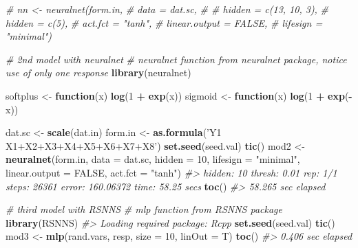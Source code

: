 \documentclass[]{book}
\newenvironment{Shaded}{\begin{snugshade}}{\end{snugshade}}
\newcommand{\CommentTok}[1]{\textcolor[rgb]{0.56,0.35,0.01}{\textit{#1}}}
\newcommand{\ControlFlowTok}[1]{\textcolor[rgb]{0.13,0.29,0.53}{\textbf{#1}}}
\newcommand{\DataTypeTok}[1]{\textcolor[rgb]{0.13,0.29,0.53}{#1}}
\newcommand{\DecValTok}[1]{\textcolor[rgb]{0.00,0.00,0.81}{#1}}
\newcommand{\KeywordTok}[1]{\textcolor[rgb]{0.13,0.29,0.53}{\textbf{#1}}}
\newcommand{\NormalTok}[1]{#1}
\newcommand{\OperatorTok}[1]{\textcolor[rgb]{0.81,0.36,0.00}{\textbf{#1}}}
\newcommand{\OtherTok}[1]{\textcolor[rgb]{0.56,0.35,0.01}{#1}}
\newcommand{\StringTok}[1]{\textcolor[rgb]{0.31,0.60,0.02}{#1}}
\begin{document}
\begin{Shaded}
\begin{Highlighting}[]
\CommentTok{# nn <- neuralnet(form.in,}
\CommentTok{#                 data = dat.sc,}
\CommentTok{#                 # hidden = c(13, 10, 3),}
\CommentTok{#                 hidden = c(5),}
\CommentTok{#                 act.fct = "tanh",}
\CommentTok{#                 linear.output = FALSE,}
\CommentTok{#                 lifesign = "minimal")}
\end{Highlighting}
\end{Shaded}

\begin{Shaded}
\begin{Highlighting}[]
\CommentTok{# 2nd model with neuralnet}
\CommentTok{# neuralnet function from neuralnet package, notice use of only one response}
\KeywordTok{library}\NormalTok{(neuralnet)}

\NormalTok{softplus <-}\StringTok{ }\ControlFlowTok{function}\NormalTok{(x) }\KeywordTok{log}\NormalTok{(}\DecValTok{1} \OperatorTok{+}\StringTok{ }\KeywordTok{exp}\NormalTok{(x))}
\NormalTok{sigmoid  <-}\StringTok{ }\ControlFlowTok{function}\NormalTok{(x) }\KeywordTok{log}\NormalTok{(}\DecValTok{1} \OperatorTok{+}\StringTok{ }\KeywordTok{exp}\NormalTok{(}\OperatorTok{-}\NormalTok{x))}

\NormalTok{dat.sc <-}\StringTok{ }\KeywordTok{scale}\NormalTok{(dat.in)}
\NormalTok{form.in <-}\StringTok{ }\KeywordTok{as.formula}\NormalTok{(}\StringTok{'Y1 ~ X1+X2+X3+X4+X5+X6+X7+X8'}\NormalTok{)}
\KeywordTok{set.seed}\NormalTok{(seed.val)}
\KeywordTok{tic}\NormalTok{()}
\NormalTok{mod2 <-}\StringTok{ }\KeywordTok{neuralnet}\NormalTok{(form.in, }\DataTypeTok{data =}\NormalTok{ dat.sc, }\DataTypeTok{hidden =} \DecValTok{10}\NormalTok{, }\DataTypeTok{lifesign =} \StringTok{"minimal"}\NormalTok{,}
                  \DataTypeTok{linear.output =} \OtherTok{FALSE}\NormalTok{,}
                  \DataTypeTok{act.fct =} \StringTok{"tanh"}\NormalTok{)}
\CommentTok{#> hidden: 10    thresh: 0.01    rep: 1/1    steps:   26361 error: 160.06372    time: 58.25 secs}
\KeywordTok{toc}\NormalTok{()}
\CommentTok{#> 58.265 sec elapsed}
\end{Highlighting}
\end{Shaded}

\begin{Shaded}
\begin{Highlighting}[]
\CommentTok{# third model with RSNNS}
\CommentTok{# mlp function from RSNNS package}
\KeywordTok{library}\NormalTok{(RSNNS)}
\CommentTok{#> Loading required package: Rcpp}
\KeywordTok{set.seed}\NormalTok{(seed.val)}
\KeywordTok{tic}\NormalTok{()}
\NormalTok{mod3 <-}\StringTok{ }\KeywordTok{mlp}\NormalTok{(rand.vars, resp, }\DataTypeTok{size =} \DecValTok{10}\NormalTok{, }\DataTypeTok{linOut =}\NormalTok{ T)}
\KeywordTok{toc}\NormalTok{()}
\CommentTok{#> 0.406 sec elapsed}
\end{Highlighting}
\end{Shaded}
\end{document}
